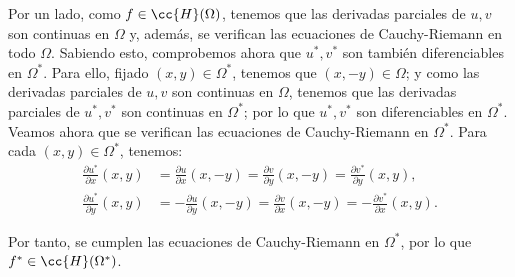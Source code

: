 \begin{ejercicio}
    Por un lado, como $f\in \cc{H}(\Omega)$, tenemos que las derivadas parciales de $u,v$ son continuas en $\Omega$ y, además, se verifican las ecuaciones de Cauchy-Riemann en todo $\Omega$. Sabiendo esto, comprobemos ahora que $u^*,v^*$ son también diferenciables en $\Omega^*$. Para ello, fijado $(x,y)\in\Omega^*$, tenemos que $(x,-y)\in\Omega$; y como las derivadas parciales de $u,v$ son continuas en $\Omega$, tenemos que las derivadas parciales de $u^*,v^*$ son continuas en $\Omega^*$; por lo que $u^*,v^*$ son diferenciables en $\Omega^*$. Veamos ahora que se verifican las ecuaciones de Cauchy-Riemann en $\Omega^*$. Para cada $(x,y)\in\Omega^*$, tenemos:
    \begin{align*}
        \frac{\partial u^*}{\partial x}(x,y) &= \frac{\partial u}{\partial x}(x,-y) = \frac{\partial v}{\partial y}(x,-y) = \frac{\partial v^*}{\partial y}(x,y),\\
        \frac{\partial u^*}{\partial y}(x,y) &= -\frac{\partial u}{\partial y}(x,-y) = \frac{\partial v}{\partial x}(x,-y) = -\frac{\partial v^*}{\partial x}(x,y).
    \end{align*}

    Por tanto, se cumplen las ecuaciones de Cauchy-Riemann en $\Omega^*$, por lo que $f^*\in \cc{H}(\Omega^*)$.
\end{ejercicio}

